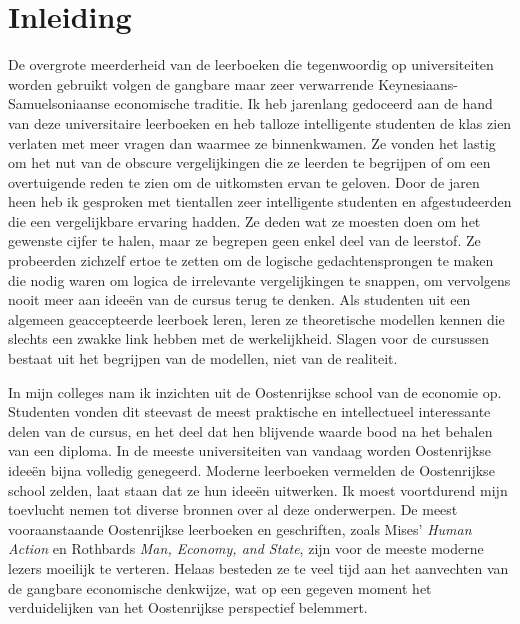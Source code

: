 \chapter{Inleiding}
De overgrote meerderheid van de leerboeken die tegenwoordig op universiteiten worden gebruikt volgen de gangbare maar zeer verwarrende Keynesiaans-Samuelson\-i\-aanse economische traditie. Ik heb jarenlang gedoceerd aan de hand van deze universitaire leerboeken en heb talloze intelligente studenten de klas zien verlaten met meer vragen dan waarmee ze binnenkwamen. Ze vonden het lastig om het nut van de obscure vergelijkingen die ze leerden te begrijpen of om een overtuigende reden te zien om de uitkomsten ervan te geloven. Door de jaren heen heb ik gesproken met tientallen zeer intelligente studenten en afgestudeerden die een vergelijkbare ervaring hadden. Ze deden wat ze moesten doen om het gewenste cijfer te halen, maar ze begrepen geen enkel deel van de leerstof. Ze probeerden zichzelf ertoe te zetten om de logische gedachtensprongen te maken die nodig waren om logica de irrelevante vergelijkingen te snappen, om vervolgens nooit meer aan ideeën van de cursus terug te denken. Als studenten uit een algemeen geaccepteerde leerboek leren, leren ze theoretische modellen kennen die slechts een zwakke link hebben met de werkelijkheid. Slagen voor de cursussen bestaat uit het begrijpen van de modellen, niet van de realiteit.

In mijn colleges nam ik inzichten uit de Oostenrijkse school van de economie op. Studenten vonden dit steevast de meest praktische en intellectueel interessante delen van de cursus, en het deel dat hen blijvende waarde bood na het behalen van een diploma. In de meeste universiteiten van vandaag worden Oostenrijkse ideeën bijna volledig genegeerd. Moderne leerboeken vermelden de Oostenrijkse school zelden, laat staan dat ze hun ideeën uitwerken. Ik moest voortdurend mijn toevlucht nemen tot diverse bronnen over al deze onderwerpen. De meest vooraanstaande Oostenrijkse leerboeken en geschriften, zoals Mises' \textit{Human Action} en Rothbards \textit{Man, Economy, and State}, zijn voor de meeste moderne lezers moeilijk te verteren. Helaas besteden ze te veel tijd aan het aanvechten van de gangbare economische denkwijze, wat op een gegeven moment het verduidelijken van het Oostenrijkse perspectief belemmert.

